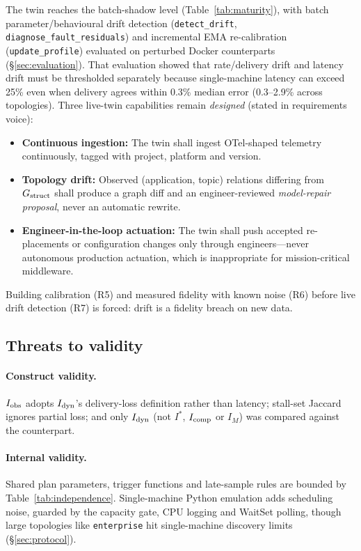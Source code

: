 The twin reaches the batch-shadow level (Table~\ref{tab:maturity}), with batch parameter/behavioural drift detection (\texttt{detect\_drift}, \texttt{diagnose\_fault\_residuals}) and incremental EMA re-calibration (\texttt{update\_profile}) evaluated on perturbed Docker counterparts (\S\ref{sec:evaluation}). That evaluation showed that rate/delivery drift and latency drift must be thresholded separately because single-machine latency can exceed 25\% even when delivery agrees within 0.3\% median error (0.3--2.9\% across topologies). Three live-twin capabilities remain \emph{designed} (stated in requirements voice):
\begin{itemize}[leftmargin=*,nosep]
  \item \textbf{Continuous ingestion:} The twin shall ingest OTel-shaped telemetry continuously, tagged with project, platform and version.
  \item \textbf{Topology drift:} Observed (application, topic) relations differing from $G_{\mathrm{struct}}$ shall produce a graph diff and an engineer-reviewed \emph{model-repair proposal}, never an automatic rewrite.
  \item \textbf{Engineer-in-the-loop actuation:} The twin shall push accepted re-placements or configuration changes only through engineers---never autonomous production actuation, which is inappropriate for mission-critical middleware.
\end{itemize}
Building calibration (R5) and measured fidelity with known noise (R6) before live drift detection (R7) is forced: drift is a fidelity breach on new data.

\subsection{Threats to validity}
\label{sec:threats}

\paragraph{Construct validity.} $I_{\mathrm{obs}}$ adopts $I_{\mathrm{dyn}}$'s delivery-loss definition rather than latency; stall-set Jaccard ignores partial loss; and only $I_{\mathrm{dyn}}$ (not $I^*$, $I_{\mathrm{comp}}$ or $I_M$) was compared against the counterpart.

\paragraph{Internal validity.} Shared plan parameters, trigger functions and late-sample rules are bounded by Table~\ref{tab:independence}. Single-machine Python emulation adds scheduling noise, guarded by the capacity gate, CPU logging and WaitSet polling, though large topologies like \texttt{enterprise} hit single-machine discovery limits (\S\ref{sec:protocol}).

